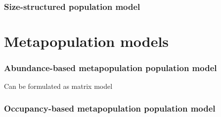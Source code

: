 \documentclass[color=usenames,dvipsnames]{beamer}\usepackage[]{graphicx}\usepackage[]{color}
\begin{document}
\begin{frame}
  \frametitle{Size-structured population model}

\end{frame}


\section{Metapopulation models}

\begin{frame}
  \frametitle{\large Abundance-based metapopulation population model}
  Can be formulated as matrix model
\end{frame}


\begin{frame}
  \frametitle{\large Occupancy-based metapopulation population model}

\end{frame}










    
    
\end{document}
